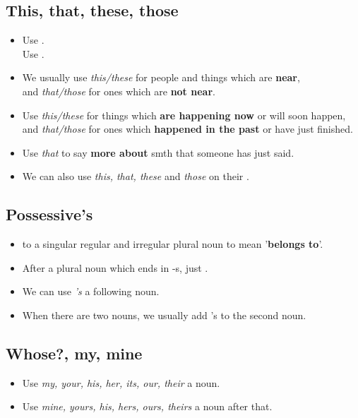 \subsection{This, that, these, those}
\begin{itemize}
    \item Use .\\
    Use .
    \item We usually use \textit{this/these} for people and things which are \textbf{near},\\
    and \textit{that/those} for ones which are \textbf{not near}.
    \item Use \textit{this/these} for things which \textbf{are happening now} or will soon happen,\\
    and \textit{that/those} for ones which \textbf{happened in the past} or have just finished.
    \item Use \textit{that} to say \textbf{more about} smth that someone has just said.
    \item We can also use \textit{this, that, these} and \textit{those} on their .
\end{itemize}

\subsection{Possessive's}
\begin{itemize}
    \item {} to a singular regular and irregular plural noun to mean '\textbf{belongs to}'.
    \item After a plural noun which ends in -s, just .
    \item We can use \textit{'s}  a following noun.
    \item When there are two nouns, we usually add 's to the second noun.
\end{itemize}

\subsection{Whose?, my, mine}
\begin{itemize}
    \item Use \textit{my, your, his, her, its, our, their}  a noun.
    \item Use \textit{mine, yours, his, hers, ours, theirs}  a noun after that.
\end{itemize}

